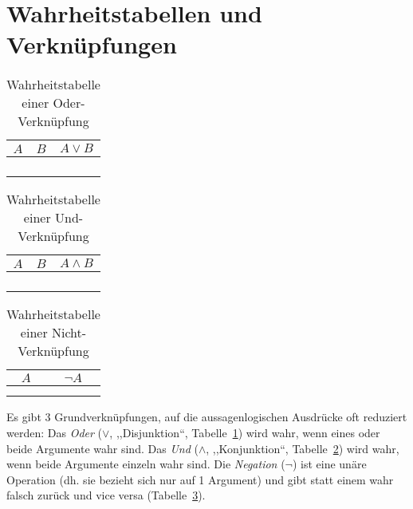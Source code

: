 \section{Wahrheitstabellen und Verknüpfungen}
%
\begin{table}[p]
 \begin{center}
  \begin{tabular}{cc|c}
   \hline
    $A$ & $B$ & $A \lor B$ \\
   \hline \hline
    \F  & \F  & \F \\
    \F  & \T  & \T \\
    \T  & \F  & \T \\
    \T  & \T  & \T \\
  \end{tabular}
  \caption{Wahrheitstabelle einer Oder-Verknüpfung}
  \label{fig:or_operator}
 \end{center}
\end{table}
\begin{table}[p]
 \begin{center}
  \begin{tabular}{cc|c}
   \hline
    $A$ & $B$ & $A \land B$ \\
   \hline \hline
    \F  & \F  & \F \\
    \F  & \T  & \F \\
    \T  & \F  & \F \\
    \T  & \T  & \T \\
  \end{tabular}
  \caption{Wahrheitstabelle einer Und-Verknüpfung}
  \label{fig:and_operator}
 \end{center}
\end{table}
\begin{table}[p]
 \begin{center}
  \begin{tabular}{c|c}
   \hline
    $A$ & $\neg A$ \\
   \hline \hline
    \F   & \T \\
    \T   & \F \\
  \end{tabular}
  \caption{Wahrheitstabelle einer Nicht-Verknüpfung}
  \label{fig:neg_operator}
 \end{center}
\end{table}
%
Es gibt 3 Grundverknüpfungen, auf die aussagenlogischen Ausdrücke oft reduziert werden: Das \emph{Oder} ($\lor$, ,,Disjunktion``, Tabelle~\ref{fig:or_operator}) wird wahr, wenn eines oder beide Argumente wahr sind. Das \emph{Und} ($\land$, ,,Konjunktion``, Tabelle~\ref{fig:and_operator}) wird wahr, wenn beide Argumente einzeln wahr sind. Die \emph{Negation} ($\neg$) ist eine unäre Operation (dh. sie bezieht sich nur auf 1 Argument) und gibt statt einem wahr falsch zurück und vice versa (Tabelle~\ref{fig:neg_operator}).

